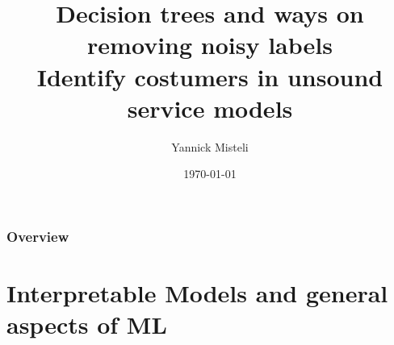 \documentclass{beamer}\usepackage[]{graphicx}\usepackage[]{color}
\title[decision trees and noisy labels]{%
Decision trees and ways on removing noisy labels\\
  \large Identify costumers in unsound service models}
\author{Yannick Misteli} %
\institute[Julius B{\"a}r] %
{
Julius B{\"a}r \\ %
\medskip
\textit{yannick.misteli@juliusbaer.com} %
}
\date{\today} %
\begin{document}
\begin{frame}[fragile]
\titlepage %



\end{frame}
\begin{frame}[fragile]
\frametitle{Overview} %
\tableofcontents %
\end{frame}
\section{Interpretable Models and general aspects of ML} %
\end{document}
